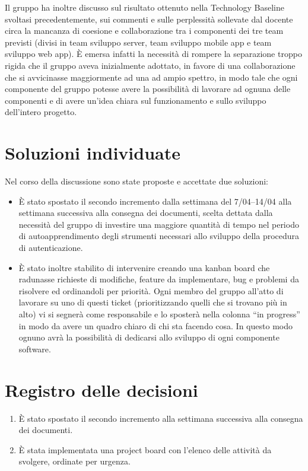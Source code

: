 \documentclass{article}
\begin{document}
Il gruppo ha inoltre discusso sul risultato ottenuto nella Technology Baseline svoltasi precedentemente, sui commenti e sulle perplessità sollevate dal docente circa la mancanza di coesione e collaborazione tra i componenti dei tre team previsti (divisi in team sviluppo server, team sviluppo mobile app e team sviluppo web app).
È emersa infatti la necessità di rompere la separazione troppo rigida che il gruppo aveva inizialmente adottato, in favore di una collaborazione che si avvicinasse maggiormente ad una ad ampio spettro, in modo tale che ogni componente del gruppo potesse avere la possibilità di lavorare ad ognuna delle componenti e di avere un'idea chiara sul funzionamento e sullo sviluppo dell'intero progetto.

\section{Soluzioni individuate}%
\label{sec:soluzioni_individuate}

Nel corso della discussione sono state proposte e accettate due soluzioni:
\begin{itemize}
  \item È stato spostato il secondo incremento dalla settimana del 7/04--14/04 alla settimana successiva alla consegna dei documenti, scelta dettata dalla necessità del gruppo di investire una maggiore quantità di tempo nel periodo di autoapprendimento degli strumenti necessari allo sviluppo della procedura di autenticazione.
  \item È stato inoltre stabilito di intervenire creando una kanban board che radunasse richieste di modifiche, feature da implementare, bug e problemi da risolvere ed ordinandoli per priorità. Ogni membro del gruppo all'atto di lavorare su uno di questi ticket (prioritizzando quelli che si trovano più in alto) vi si segnerà come responsabile e lo sposterà nella colonna ``in progress'' in modo da avere un quadro chiaro di chi sta facendo cosa. In questo modo ognuno avrà la possibilità di dedicarsi allo sviluppo di ogni componente software.
\end{itemize}

\newpage
\section{Registro delle decisioni}%
\label{sec:registro_delle_decisioni}

\begin{enumerate}
  \item È stato spostato il secondo incremento alla settimana successiva alla consegna dei documenti.
  \item È stata implementata una project board con l'elenco delle attività da svolgere, ordinate per urgenza.
\end{enumerate}

\end{document}
